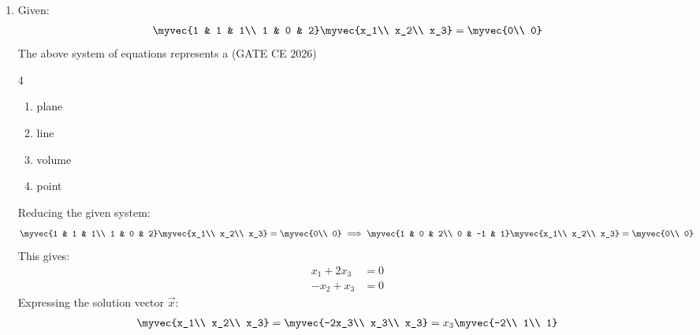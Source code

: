 \begin{enumerate}[label=\thesubsection.\arabic*, ref=\thesubsection.\theenumi, itemsep=0pt, leftmargin=*]
\begin{align}
\vec{P}^\top\vec{P} &= \myvec{2 & 0 & 2\\ 0 & 1 & 0\\ 2 & 0 & 2} \neq \vec{I}\\
\vec{P}^\top &= \vec{P} \neq -\vec{P}\\
\abs{\lambda_1} &= 0 \neq 1
\end{align}
\begin{lstlisting}[frame=single, basicstyle=\rmfamily, escapeinside={(*@}{@*)}]
(*@\makebox[\dimexpr\linewidth-2\fboxsep-2\fboxrule\relax][c]{codes/ce1q11/q11.py}@*)
\end{lstlisting}

\item Given:
\begin{align}
\myvec{1 & 1 & 1\\ 1 & 0 & 2}\myvec{x_1\\ x_2\\ x_3} = \myvec{0\\ 0} \label{eq:ce1q12_system}
\end{align}
The above system of equations represents a \hfill (GATE CE 2026)
\begin{multicols}{4}
\begin{enumerate}[label=\alph*), itemsep=0pt]
\item plane
\item line
\item volume
\item point
\end{enumerate}
\end{multicols}
\solution Reducing the given system:
\begin{align}
\myvec{1 & 1 & 1\\ 1 & 0 & 2}\myvec{x_1\\ x_2\\ x_3} = \myvec{0\\ 0} \implies \myvec{1 & 0 & 2\\ 0 & -1 & 1}\myvec{x_1\\ x_2\\ x_3} = \myvec{0\\ 0}
\end{align}
This gives:
\begin{align}
x_1 + 2x_3 &= 0\\
-x_2 + x_3 &= 0
\end{align}
Expressing the solution vector $\vec{x}$:
\begin{align}
\myvec{x_1\\ x_2\\ x_3} = \myvec{-2x_3\\ x_3\\ x_3} = x_3\myvec{-2\\ 1\\ 1}

\end{align}
\end{enumerate}
